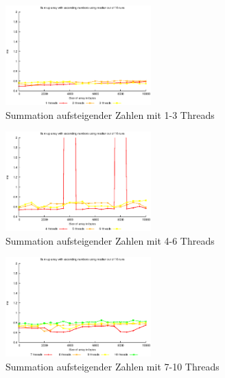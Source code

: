 \documentclass[a4paper,
12pt,
BCOR12mm,
]{scrartcl}
\begin{document}
\begin{figure}[!h]
	\begin{center}
		\includegraphics[width=0.5\textwidth]{../a_4_1/graphs/ascending_median_1st}
	\end{center}
	\caption{Summation aufsteigender Zahlen mit 1-3 Threads}
	\label{fig:ascending_1_3}
\end{figure}
\begin{figure}[!h]
	\begin{center}
		\includegraphics[width=0.5\textwidth]{../a_4_1/graphs/ascending_median_2nd}
	\end{center}
	\caption{Summation aufsteigender Zahlen mit 4-6 Threads}
	\label{fig:ascending_4_6}
\end{figure}
\begin{figure}[!h]
	\begin{center}
		\includegraphics[width=0.5\textwidth]{../a_4_1/graphs/ascending_median_3rd}
	\end{center}
	\caption{Summation aufsteigender Zahlen mit 7-10 Threads}
	\label{fig:ascending_7_10}
\end{figure}
\end{document}
